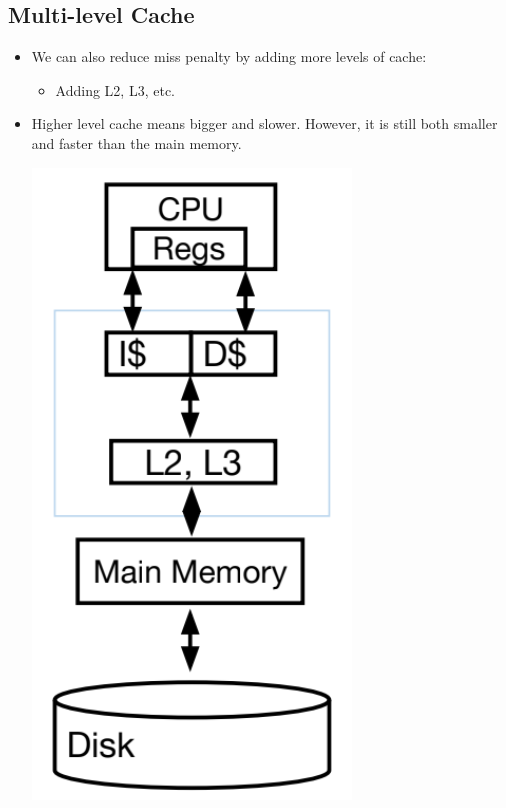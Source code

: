 \documentclass[10pt]{article}
\begin{document}
\subsection*{Multi-level Cache}
\begin{itemize}
    \item We can also reduce miss penalty by adding more levels of cache:
    \begin{itemize} 
        \item Adding L2, L3, etc.
    \end{itemize}
    \item Higher level cache means bigger and slower.  However, it is still both smaller and faster than the main memory.
    \begin{center}
        \includegraphics*[scale=0.5]{W7_5.png}
    \end{center}
\end{itemize}
\end{document}
